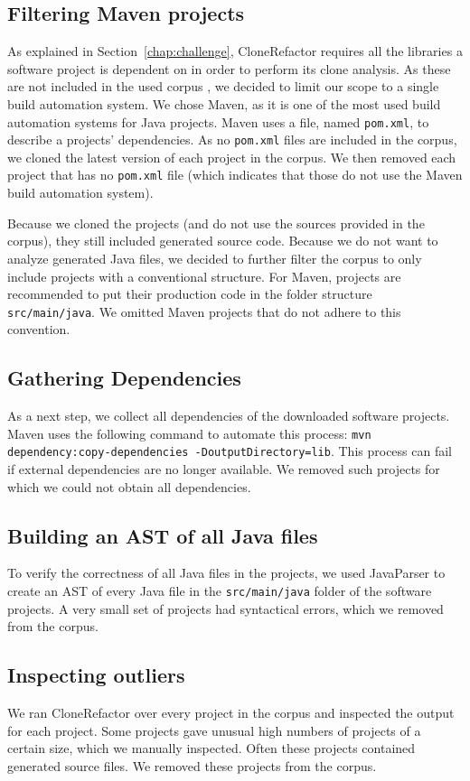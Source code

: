 \subsection{Filtering Maven projects}
As explained in Section~\ref{chap:challenge}, CloneRefactor requires all the libraries a software project is dependent on in order to perform its clone analysis. As these are not included in the used corpus \cite{githubCorpus2013}, we decided to limit our scope to a single build automation system. We chose Maven, as it is one of the most used build automation systems for Java projects. Maven uses a file, named \texttt{pom.xml}, to describe a projects' dependencies. As no \texttt{pom.xml} files are included in the corpus, we cloned the latest version of each project in the corpus. We then removed each project that has no \texttt{pom.xml} file (which indicates that those do not use the Maven build automation system).

Because we cloned the projects (and do not use the sources provided in the corpus), they still included generated source code. Because we do not want to analyze generated Java files, we decided to further filter the corpus to only include projects with a conventional structure. For Maven, projects are recommended to put their production code in the folder structure \texttt{src/main/java}. We omitted Maven projects that do not adhere to this convention.

\subsection{Gathering Dependencies}
As a next step, we collect all dependencies of the downloaded software projects. Maven uses the following command to automate this process: \texttt{mvn dependency:copy-dependencies -DoutputDirectory=lib}. This process can fail if external dependencies are no longer available. We removed such projects for which we could not obtain all dependencies.

\subsection{Building an AST of all Java files}
To verify the correctness of all Java files in the projects, we used JavaParser \cite{tomassetti2017javaparser} to create an AST of every Java file in the \texttt{src/main/java} folder of the software projects. A very small set of projects had syntactical errors, which we removed from the corpus.

\subsection{Inspecting outliers}
We ran CloneRefactor over every project in the corpus and inspected the output for each project. Some projects gave unusual high numbers of projects of a certain size, which we manually inspected. Often these projects contained generated source files. We removed these projects from the corpus.

